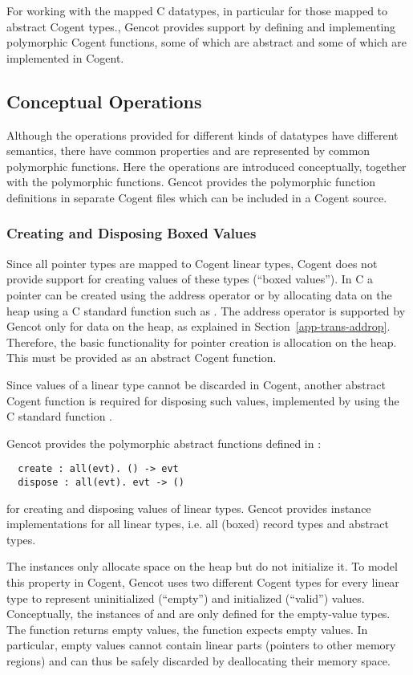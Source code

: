 For working with the mapped C datatypes, in particular for those mapped to abstract Cogent types., Gencot provides support by
defining and implementing polymorphic Cogent functions, some of which are abstract and some of which are implemented in Cogent.

\subsection{Conceptual Operations}
\label{design-operations-concept}

Although the operations provided for different kinds of datatypes have different semantics, there have common properties
and are represented by common polymorphic functions. Here the operations are introduced conceptually, together with
the polymorphic functions. Gencot provides the polymorphic function definitions in separate Cogent files which can be
included in a Cogent source.

\subsubsection{Creating and Disposing Boxed Values}

Since all pointer types are mapped to Cogent linear types, Cogent does not provide support for creating values
of these types (``boxed values''). In C a pointer can be created using the address operator \code{\&} or by allocating data on
the heap using a C standard function such as . The address operator is supported by Gencot
only for data on the heap, as explained in Section~\ref{app-trans-addrop}. Therefore, the basic functionality
for pointer creation is allocation on the heap. This must be provided as an abstract Cogent function.

Since values of a linear type cannot be discarded in Cogent, another abstract Cogent function is required for
disposing such values, implemented by using the C standard function .

Gencot provides the polymorphic abstract functions defined in :
\begin{verbatim}
  create : all(evt). () -> evt
  dispose : all(evt). evt -> ()
\end{verbatim}
for creating and disposing values of linear types. Gencot provides instance implementations for all linear
types, i.e. all (boxed) record types and abstract types.

The  instances only allocate space on the heap but do not initialize it. To model this property in 
Cogent, Gencot uses two different Cogent types for every linear type to represent uninitialized (``empty'') and 
initialized (``valid'') values.
Conceptually, the instances of  and  are only defined for the empty-value types.
The function  returns empty values, the function  expects empty values. In particular,
empty values cannot contain linear parts (pointers to other memory regions) and can thus be safely discarded by 
deallocating their memory space. 

